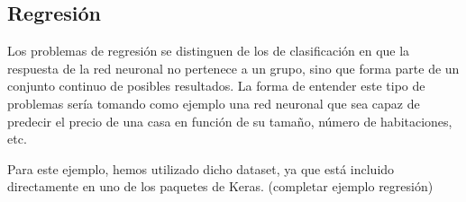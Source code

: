 \subsection{Regresión}
Los problemas de regresión se distinguen de los de clasificación en que la respuesta de la red neuronal no pertenece a un grupo, sino que forma parte de un conjunto continuo de posibles resultados. La forma de entender este tipo de problemas sería tomando como ejemplo una red neuronal que sea capaz de predecir el precio de una casa en función de su tamaño, número de habitaciones, etc. 

Para este ejemplo, hemos utilizado dicho dataset, ya que está incluido directamente en uno de los paquetes de Keras. 
(completar ejemplo regresión)




